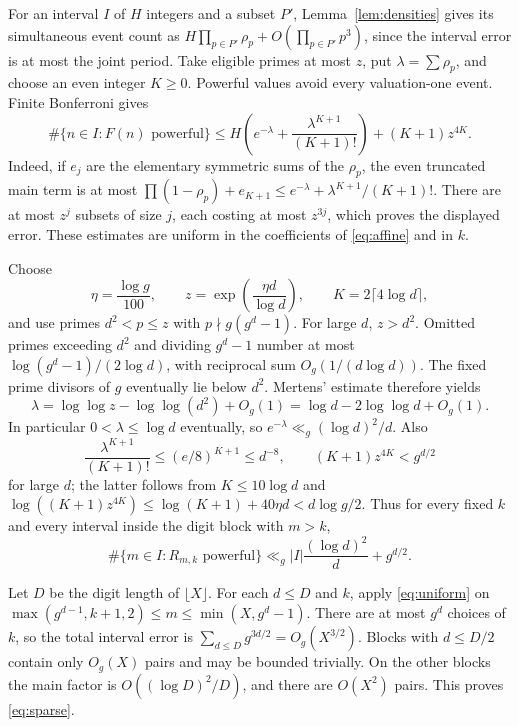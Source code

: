\documentclass[10pt]{article}
\begin{document}
For an interval $I$ of $H$ integers and a subset $P'$, Lemma~\ref{lem:densities}
gives its simultaneous event count as
$H\prod_{p\in P'}\rho_p+O(\prod_{p\in P'}p^3)$, since the interval error
is at most the joint period. Take eligible primes at most $z$, put
$\lambda=\sum\rho_p$, and choose an even integer $K\ge0$.
Powerful values avoid every valuation-one event. Finite Bonferroni gives
\begin{equation}\label{eq:sieve}
 \#\{n\in I:F(n)\text{ powerful}\}
 \le H\left(e^{-\lambda}+\frac{\lambda^{K+1}}{(K+1)!}\right)
       +(K+1)z^{4K}.
\end{equation}
Indeed, if $e_j$ are the elementary symmetric sums of the $\rho_p$,
the even truncated main term is at most
$\prod(1-\rho_p)+e_{K+1}\le e^{-\lambda}+\lambda^{K+1}/(K+1)!$.
There are at most $z^j$ subsets of size $j$, each costing at most $z^{3j}$,
which proves the displayed error. These estimates are uniform in the
coefficients of \eqref{eq:affine} and in $k$.

Choose
\[
 \eta=\frac{\log g}{100},\qquad
 z=\exp\!\left(\frac{\eta d}{\log d}\right),\qquad
 K=2\lceil4\log d\rceil,
\]
and use primes $d^2<p\le z$ with $p\nmid g(g^d-1)$.
For large $d$, $z>d^2$. Omitted primes exceeding $d^2$ and dividing $g^d-1$
number at most $\log(g^d-1)/(2\log d)$, with reciprocal sum
$O_g(1/(d\log d))$. The fixed prime divisors of $g$ eventually lie below $d^2$.
Mertens' estimate \cite{mertens} therefore yields
\[
 \lambda=\log\log z-\log\log(d^2)+O_g(1)
        =\log d-2\log\log d+O_g(1).
\]
In particular $0<\lambda\le\log d$ eventually, so
$e^{-\lambda}\ll_g(\log d)^2/d$. Also
\[
 \frac{\lambda^{K+1}}{(K+1)!}\le(e/8)^{K+1}\le d^{-8},\qquad
 (K+1)z^{4K}<g^{d/2}
\]
for large $d$; the latter follows from $K\le10\log d$ and
$\log((K+1)z^{4K})\le\log(K+1)+40\eta d<d\log g/2$.
Thus for every fixed $k$ and every interval inside the digit block with $m>k$,
\begin{equation}\label{eq:uniform}
 \#\{m\in I:R_{m,k}\text{ powerful}\}
 \ll_g |I|\frac{(\log d)^2}{d}+g^{d/2}.
\end{equation}

Let $D$ be the digit length of $\lfloor X\rfloor$.
For each $d\le D$ and $k$, apply \eqref{eq:uniform} on
$\max(g^{d-1},k+1,2)\le m\le\min(X,g^d-1)$.
There are at most $g^d$ choices of $k$, so the total interval error is
$\sum_{d\le D}g^{3d/2}=O_g(X^{3/2})$.
Blocks with $d\le D/2$ contain only $O_g(X)$ pairs and may be bounded trivially.
On the other blocks the main factor is $O((\log D)^2/D)$, and there are
$O(X^2)$ pairs. This proves \eqref{eq:sparse}.
\end{document}
